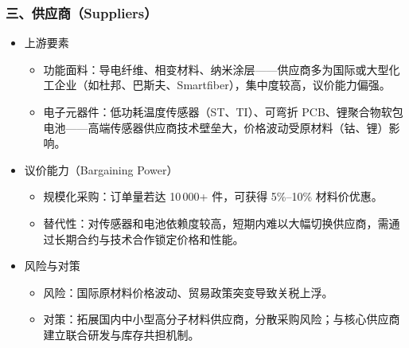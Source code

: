 \documentclass[UTF8]{report}
\theoremstyle{MyLineTheoremStyle} %
\theoremstyle{MyBlockTheoremStyle} %
\theoremstyle{MySubsubsectionStyle} %
\begin{document}
\subsubsection{三、供应商（Suppliers）}
    \begin{itemize}
      \item 上游要素
        \begin{itemize}
          \item 功能面料：导电纤维、相变材料、纳米涂层——供应商多为国际或大型化工企业（如杜邦、巴斯夫、Smartfiber），集中度较高，议价能力偏强。
          \item 电子元器件：低功耗温度传感器（ST、TI）、可弯折 PCB、锂聚合物软包电池——高端传感器供应商技术壁垒大，价格波动受原材料（钴、锂）影响。
        \end{itemize}
      \item 议价能力（Bargaining Power）
        \begin{itemize}
          \item 规模化采购：订单量若达 10\,000+ 件，可获得 5\%–10\% 材料价优惠。
          \item 替代性：对传感器和电池依赖度较高，短期内难以大幅切换供应商，需通过长期合约与技术合作锁定价格和性能。
        \end{itemize}
      \item 风险与对策
        \begin{itemize}
          \item 风险：国际原材料价格波动、贸易政策突变导致关税上浮。
          \item 对策：拓展国内中小型高分子材料供应商，分散采购风险；与核心供应商建立联合研发与库存共担机制。
        \end{itemize}
    \end{itemize}
\end{document}
